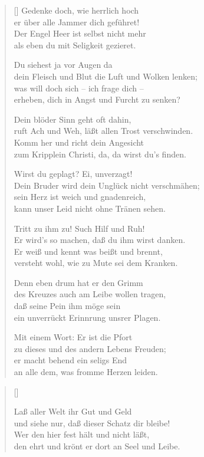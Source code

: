 \begin{multicols}{2}
\begin{verse}[\versewidth]
 Gedenke doch, wie herrlich hoch\\
er über alle Jammer dich geführet!\\
Der Engel Heer ist selbst nicht mehr\\
als eben du mit Seligkeit gezieret.

 Du siehest ja vor Augen da\\
dein Fleisch und Blut die Luft und Wolken lenken;\\
was will doch sich – ich frage dich –\\
erheben, dich in Angst und Furcht zu senken?

 Dein blöder Sinn geht oft dahin,\\
ruft Ach und Weh, läßt allen Trost verschwinden.\\
Komm her und richt dein Angesicht\\
zum Kripplein Christi, da, da wirst du's finden.

 Wirst du geplagt? Ei, unverzagt!\\
Dein Bruder wird dein Unglück nicht verschmähen;\\
sein Herz ist weich und gnadenreich,\\
kann unser Leid nicht ohne Tränen sehen.

 Tritt zu ihm zu! Such Hilf und Ruh!\\
Er wird's so machen, daß du ihm wirst danken.\\
Er weiß und kennt was beißt und brennt,\\
versteht wohl, wie zu Mute sei dem Kranken.

 Denn eben drum hat er den Grimm\\
des Kreuzes auch am Leibe wollen tragen,\\
daß seine Pein ihm möge sein\\
ein unverrückt Erinnrung unsrer Plagen.

 Mit einem Wort: Er ist die Pfort\\
zu dieses und des andern Lebens Freuden;\\
er macht behend ein seligs End\\
an alle dem, was fromme Herzen leiden.

\end{verse}
\end{multicols}

\begin{center}
\settowidth{\versewidth}{Der, vor dem die Welt erschrickt,}
\begin{verse}[\versewidth]

 Laß aller Welt ihr Gut und Geld\\
und siehe nur, daß dieser Schatz dir bleibe!\\
Wer den hier fest hält und nicht läßt,\\
den ehrt und krönt er dort an Seel und Leibe.

\end{verse}
\end{center}



